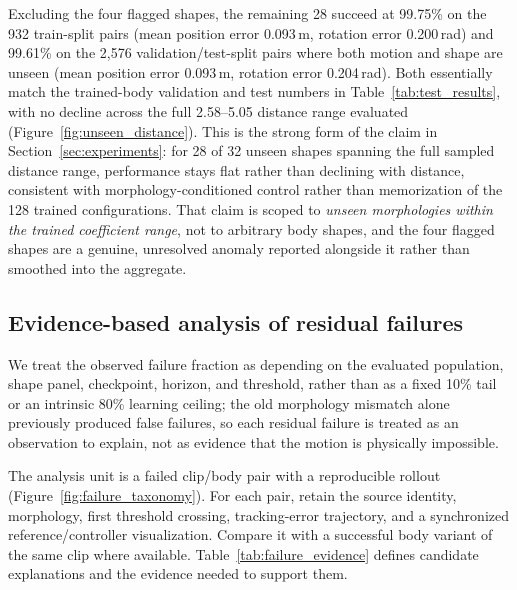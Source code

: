 Excluding the four flagged shapes, the remaining 28 succeed at 99.75\% on
the 932 train-split pairs (mean position error 0.093\,m, rotation error
0.200\,rad) and 99.61\% on the 2{,}576 validation/test-split pairs where both
motion and shape are unseen (mean position error 0.093\,m, rotation error
0.204\,rad). Both essentially match the trained-body validation and test
numbers in Table~\ref{tab:test_results}, with no decline across the full
2.58--5.05 distance range evaluated (Figure~\ref{fig:unseen_distance}).
This is the strong form of the claim in Section~\ref{sec:experiments}: for
28 of 32 unseen shapes spanning the full sampled distance range, performance
stays flat rather than declining with distance, consistent with
morphology-conditioned control rather than memorization of the 128 trained
configurations. That claim is scoped to \emph{unseen morphologies within the
trained coefficient range}, not to arbitrary body shapes, and the four
flagged shapes are a genuine, unresolved anomaly reported alongside it
rather than smoothed into the aggregate.

\subsection{Evidence-based analysis of residual failures}\label{sec:failures}

We treat the observed failure fraction as depending on the evaluated
population, shape panel, checkpoint, horizon, and threshold, rather than as a
fixed 10\% tail or an intrinsic 80\% learning ceiling; the old morphology
mismatch alone previously produced false failures, so each residual failure
is treated as an observation to explain, not as evidence that the motion is
physically impossible.

The analysis unit is a failed clip/body pair with a reproducible rollout
(Figure~\ref{fig:failure_taxonomy}). For each pair, retain the source
identity, morphology, first threshold crossing, tracking-error trajectory,
and a synchronized reference/controller visualization. Compare it with a
successful body variant of the same clip where available.
Table~\ref{tab:failure_evidence} defines candidate
explanations and the evidence needed to support them.

